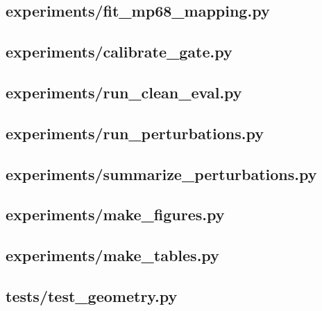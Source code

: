 \subsection*{experiments/fit\_mp68\_mapping.py}
\subsection*{experiments/calibrate\_gate.py}
\subsection*{experiments/run\_clean\_eval.py}
\subsection*{experiments/run\_perturbations.py}
\subsection*{experiments/summarize\_perturbations.py}
\subsection*{experiments/make\_figures.py}
\subsection*{experiments/make\_tables.py}
\subsection*{tests/test\_geometry.py}
